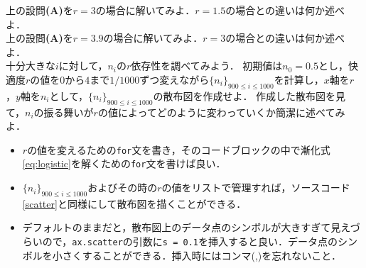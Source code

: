 \documentclass[a4paper,12pt]{jsarticle}
\begin{document}
上の設問{\bf (A)}を$r=3$の場合に解いてみよ．$r=1.5$の場合との違いは何か述べよ．\\

上の設問{\bf (A)}を$r=3.9$の場合に解いてみよ．$r=3$の場合との違いは何か述べよ．\\

十分大きな$i$に対して，$n_{i}$の$r$依存性を調べてみよう．
初期値は$n_{0}=0.5$とし，快適度$r$の値を$0$から$4$まで$1/1000$ずつ変えながら$\{n_{i}\}_{900\le i\le 1000}$を計算し，$x$軸を$r$，$y$軸を$n_{i}$として，$\{n_{i}\}_{900\le i\le 1000}$の散布図を作成せよ．
作成した散布図を見て，$n_{i}$の振る舞いが$r$の値によってどのように変わっていくか簡潔に述べてみよ．\\

\begin{itemize}
    \item $r$の値を変えるための\texttt{for}文を書き，そのコードブロックの中で漸化式\eqref{eq:logistic}を解くための\texttt{for}文を書けば良い．
    \item $\{n_{i}\}_{900\le i\le 1000}$およびその時の$r$の値をリストで管理すれば，ソースコード\ref{scatter}と同様にして散布図を描くことができる．
    \item デフォルトのままだと，散布図上のデータ点のシンボルが大きすぎて見えづらいので，\texttt{ax.scatter}の引数に\texttt{s = 0.1}を挿入すると良い．データ点のシンボルを小さくすることができる．挿入時にはコンマ(,)を忘れないこと．
\end{itemize}

%
%
\end{document}
